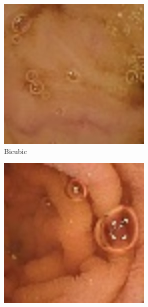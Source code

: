 \begin{figure}[H]
    \begin{subfigure}[b]{0.32\textwidth}
    \includegraphics[width=\textwidth]{Chapter7/Bicubic_9.jpg}
    \caption{Bicubic}
  \end{subfigure}
  \begin{subfigure}[b]{0.32\textwidth}
    \includegraphics[width=\textwidth]{Chapter7/Bicubic_445.jpg}

\end{subfigure}
\end{figure}
